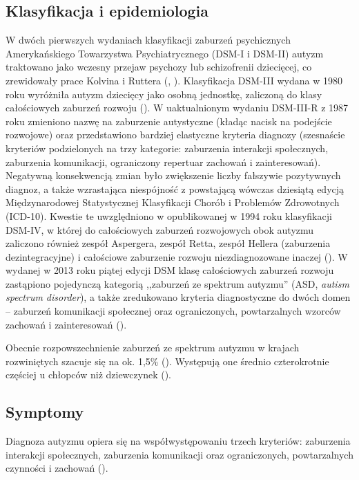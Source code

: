     \subsection{Klasyfikacja i epidemiologia}
    W dwóch pierwszych wydaniach klasyfikacji zaburzeń psychicznych Amerykańskiego Towarzystwa Psychiatrycznego (DSM-I i DSM-II) autyzm traktowano jako wczesny przejaw psychozy lub schizofrenii dziecięcej, co zrewidowały prace Kolvina i Ruttera (\cite{kolvin1972infantile}, \cite{rutter1972childhood}).
    Klasyfikacja DSM-III wydana w 1980 roku wyróżniła autyzm dziecięcy jako osobną jednostkę, zaliczoną do klasy całościowych zaburzeń rozwoju (\cite{volkmar2014kanner}).
    W uaktualnionym wydaniu DSM-III-R z 1987 roku zmieniono nazwę na zaburzenie autystyczne (kładąc nacisk na podejście rozwojowe) oraz przedstawiono bardziej elastyczne kryteria diagnozy (szesnaście kryteriów podzielonych na trzy kategorie: zaburzenia interakcji społecznych, zaburzenia komunikacji, ograniczony repertuar zachowań i zainteresowań).
    Negatywną konsekwencją zmian było zwiększenie liczby fałszywie pozytywnych diagnoz, a także wzrastająca niespójność z powstającą wówczas dziesiątą edycją Międzynarodowej Statystycznej Klasyfikacji Chorób i Problemów Zdrowotnych (ICD-10).
    Kwestie te uwzględniono w opublikowanej w 1994 roku klasyfikacji DSM-IV, w której do całościowych zaburzeń rozwojowych obok autyzmu zaliczono również zespół Aspergera, zespół Retta, zespół Hellera (zaburzenia dezintegracyjne) i całościowe zaburzenie rozwoju niezdiagnozowane inaczej (\cite{volkmar2014kanner}).
    W wydanej w 2013 roku piątej edycji DSM klasę całościowych zaburzeń rozwoju zastąpiono pojedynczą kategorią ,,zaburzeń ze spektrum autyzmu'' (ASD, \emph{autism spectrum disorder}), a także zredukowano kryteria diagnostyczne do dwóch domen -- zaburzeń komunikacji społecznej oraz ograniczonych, powtarzalnych wzorców zachowań i zainteresowań (\cite{maenner2014potential}).
    
    Obecnie rozpowszechnienie zaburzeń ze spektrum autyzmu w krajach rozwiniętych szacuje się na ok. 1,5\% (\cite{lyall2017changing}).
    Występują one średnio czterokrotnie częściej u chłopców niż dziewczynek (\cite{lyall2017changing}).
    
    \subsection{Symptomy}
    Diagnoza autyzmu opiera się na współwystępowaniu trzech kryteriów: zaburzenia interakcji społecznych, zaburzenia komunikacji oraz ograniczonych, powtarzalnych czynności i zachowań (\cite{frith2008autyzm}).
    
